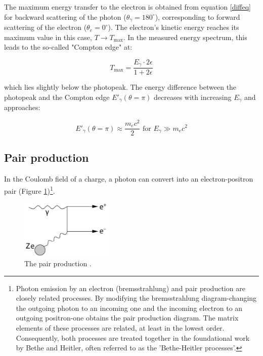 The maximum energy transfer to the electron is obtained 
from equation \ref{diffeq} for backward scattering of the 
photon ($\theta_\gamma = 180^\circ$), corresponding to 
forward scattering of the electron ($\theta_e = 0^\circ$). 
The electron's kinetic energy reaches its maximum value in 
this case, $T \rightarrow T_{\text{max}}$. In the measured 
energy spectrum, this leads to the so-called "Compton edge" at:

\begin{equation}
T_{\text{max}} = \frac{E_\gamma \cdot 2\epsilon}{1 + 2\epsilon}
\end{equation}

which lies slightly below the photopeak. The energy difference 
between the photopeak and the Compton edge $E'_\gamma(\theta = \pi)$ 
decreases with increasing $E_\gamma$ and approaches:

\begin{equation}
E'_\gamma(\theta = \pi) \approx \frac{m_e c^2}{2} \text{ for } E_\gamma \gg m_e c^2
\end{equation}

\subsection{Pair production}
In the Coulomb field of a charge, a photon can 
convert into an electron-positron pair (Figure 
\ref{fig:pprod})\footnote{Photon emission by an 
electron (bremsstrahlung) and pair production are closely 
related processes. By modifying the bremsstrahlung diagram-changing 
the outgoing photon to an incoming one and the incoming electron to 
an outgoing positron-one obtains the pair production 
diagram. The matrix elements of these processes are 
related, at least in the lowest order. Consequently, both 
processes are treated together in the foundational work by 
Bethe and Heitler, often referred to as the 'Bethe-Heitler processes'.}.

\begin{figure}[!h]
    \centering
    \includegraphics[width=0.4\textwidth]{figures/png/Screenshot_20240812_204755.png}
    \caption[The pair production.]{The pair production \cite{kola}.}
    \label{fig:pprod}
\end{figure}

